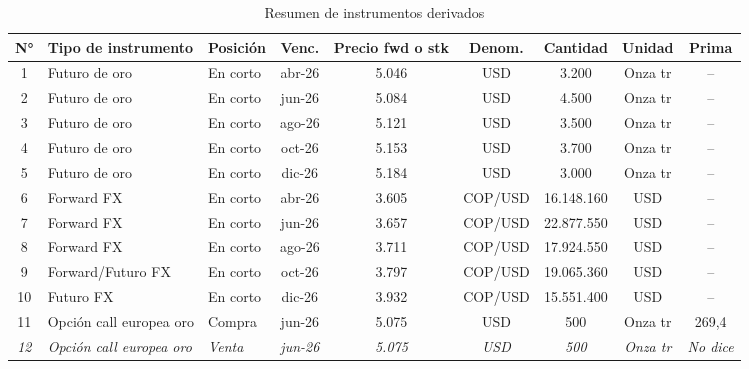 \documentclass{article}
\theoremstyle{remark}
\theoremstyle{definition}
\begin{document}
\begin{table}[H]
\centering
\caption{Resumen de instrumentos derivados\footnotemark}
\footnotesize
\renewcommand{\arraystretch}{1.2}

\begin{tabularx}{\textwidth}{c l l c c c c c c}
\toprule
\textbf{N°} & 
\textbf{Tipo de instrumento} & 
\textbf{Posición} & 
\textbf{Venc.} & 
\textbf{Precio fwd o stk} & 
\textbf{Denom.} & 
\textbf{Cantidad} & 
\textbf{Unidad} & 
\textbf{Prima} \\
\midrule

1 & Futuro de oro  & En corto & abr-26 & 5.046 & USD & 3.200 & Onza tr & -- \\ 
2 & Futuro de oro & En corto & jun-26 & 5.084 & USD & 4.500 & Onza tr & -- \\ 
3 & Futuro de oro & En corto & ago-26 & 5.121 & USD & 3.500 & Onza tr & -- \\ 
4 & Futuro de oro & En corto & oct-26 & 5.153 & USD & 3.700 & Onza tr & -- \\ 
5 & Futuro de oro & En corto & dic-26 & 5.184 & USD & 3.000 & Onza tr & -- \\ 

\midrule

6 & Forward FX & En corto & abr-26 & 3.605 & COP/USD & 16.148.160 & USD & -- \\ 
7 & Forward FX  & En corto & jun-26 & 3.657 & COP/USD & 22.877.550 & USD & -- \\ 
8 & Forward FX & En corto & ago-26 & 3.711 & COP/USD & 17.924.550 & USD & -- \\ 
9 & Forward/Futuro FX & En corto & oct-26 & 3.797 & COP/USD & 19.065.360 & USD & -- \\ 
10 & Futuro FX & En corto & dic-26 & 3.932 & COP/USD & 15.551.400 & USD & -- \\ 

\midrule

11 & Opción call europea oro & Compra & jun-26 & 5.075 & USD & 500 & Onza tr & 269,4 \\ 
\textit{12} & \textit{Opción call europea oro} & \textit{Venta} & \textit{jun-26} & \textit{5.075} & \textit{USD} & \textit{500} & \textit{Onza tr} & \textit{No dice} \\ 

\bottomrule
\end{tabularx}
\end{table}
\end{document}
